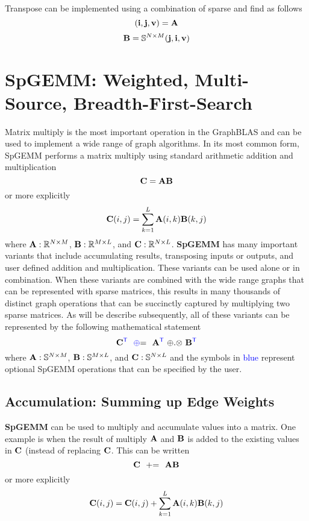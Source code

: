 Transpose can be implemented using a combination of sparse and find as follows
$$
	({\bf i},{\bf j},{\bf v}) = {\bf A}
$$
$$
   \mathbf{B} = \mathbb{S}^{N \times M}({\bf j},{\bf i},{\bf v})
$$

  
\section{SpGEMM: Weighted, Multi-Source, Breadth-First-Search}

Matrix multiply is the most important operation in the GraphBLAS and can be used to implement a wide range of graph algorithms.  In its most common form, SpGEMM performs a matrix multiply using standard arithmetic addition and multiplication
$$
   {\bf C} = {\bf A} {\bf B}
$$
or more explicitly
$$
   {\bf C}(i,j) = \sum_{k=1}^L {\bf A}(i,k) {\bf B}(k,j)
$$
where  ${\bf A}: \mathbb{R}^{N \times M}$,  ${\bf B}: \mathbb{R}^{M \times L}$, and ${\bf C}: \mathbb{R}^{N \times L}$. {\bf SpGEMM} has many important variants that include accumulating results, transposing inputs or outputs, and user defined addition and multiplication.  These variants can be used alone or in combination.  When these variants are combined with the wide range graphs that can be represented with sparse matrices, this results in many thousands of distinct graph operations that can be succinctly captured by multiplying two sparse matrices.   As will be describe subsequently, all of these variants can be represented by the following mathematical statement
$$
   {\bf C}^{\textcolor{blue}{\sf T}} ~~ {\textcolor{blue}{\oplus}}{=} ~~ {\bf A}^{\textcolor{blue}{\sf T}} ~ {\oplus}.{\otimes} ~ {\bf B}^{\textcolor{blue}{\sf T}}
$$
where  ${\bf A}: \mathbb{S}^{N \times M}$,  ${\bf B}: \mathbb{S}^{M \times L}$, and ${\bf C}: \mathbb{S}^{N \times L}$ and the symbols in \textcolor{blue}{blue} represent optional SpGEMM operations that can be specified by the user.

\subsection{Accumulation: Summing up Edge Weights}

{\bf SpGEMM} can be used to multiply and accumulate values into a matrix.  One example is when the result of multiply ${\bf A}$ and ${\bf B}$ is added to the existing values in ${\bf C}$ (instead of replacing ${\bf C}$.  This can be written
$$
   {\bf C} ~~ {+}{=} ~~ {\bf A} {\bf B}
$$
or more explicitly
$$
   {\bf C}(i,j) = {\bf C}(i,j) + \sum_{k=1}^L {\bf A}(i,k) {\bf B}(k,j)
$$

